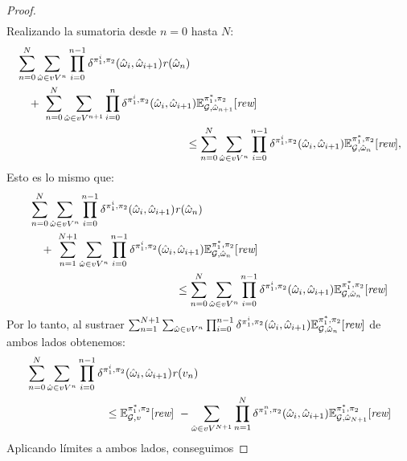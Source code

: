 \begin{proof}
\begin{align*}
  \end{align*}
  Realizando la sumatoria desde $n=0$ hasta $N$:
  \begin{align*}
    & \sum^{N}_{n=0}\sum_{\hat{\omega} \in vV^{n}} \prod^{n-1}_{i=0}\delta^{\strat{1}^i,\strat{2}}(\hat{\omega}_i,\hat{\omega}_{i+1}) \reward(\hat{\omega}_n) \\
    & \quad + \ \sum^{N}_{n=0} \sum_{\hat{\omega} \in vV^{n+1}} \prod^{n}_{i=0}\delta^{\strat{1}^i,\strat{2}}(\hat{\omega}_i,\hat{\omega}_{i+1})  \Expect{\starredstrat{1}}{\strat{2}}_{\StochG,\hat{\omega}_{n+1}}[\Rewards] \\
    & \hspace{15em} \leq 
	\sum^{N}_{n=0}
	\sum_{\hat{\omega} \in vV^{n}} \prod^{n-1}_{i=0}\delta^{\strat{1}^i,\strat{2}}(\hat{\omega}_i, \hat{\omega}_{i+1}) \Expect{\starredstrat{1}}{\strat{2}}_{\StochG,\hat{\omega}_n}[\Rewards],
  \end{align*}
  Esto es lo mismo que:
  \begin{align*}
    & \sum^{N}_{n=0}\sum_{\hat{\omega} \in vV^{n}} \prod^{n-1}_{i=0}\delta^{\strat{1}^i,\strat{2}}(\hat{\omega}_i,\hat{\omega}_{i+1}) \reward(\hat{\omega}_n) \\
    & \quad + \
	\sum^{N+1}_{n=1} \sum_{\hat{\omega} \in vV^{n}} \prod^{n-1}_{i=0}\delta^{\strat{1}^i,\strat{2}}(\hat{\omega}_i,\hat{\omega}_{i+1})  \Expect{\starredstrat{1}}{\strat{2}}_{\StochG,\hat{\omega}_{n}}[\Rewards] \\
    & \hspace{13em} \leq 
	 \sum^{N}_{n=0}
	\sum_{\hat{\omega} \in vV^{n}} \prod^{n-1}_{i=0}\delta^{\strat{1}^i,\strat{2}}(\hat{\omega}_i, \hat{\omega}_{i+1}) \Expect{\starredstrat{1}}{\strat{2}}_{\StochG,\hat{\omega}_n}[\Rewards]
  \end{align*}
  Por lo tanto, al sustraer $\sum^{N+1}_{n=1} \sum_{\hat{\omega} \in vV^{n}} \prod^{n-1}_{i=0}\delta^{\pi_{1}^i,\pi_{2}}(\hat{\omega}_i,\hat{\omega}_{i+1})  \mathbb{E}^{\pi^*_{1}, \pi_{2}}_{\mathcal{G},\hat{\omega}_{n}}[\textit{rew}]$ de ambos lados obtenemos:
  \begin{align*}
    & \sum^{N}_{n=0}\sum_{\hat{\omega} \in vV^{n}} \prod^{n-1}_{i=0}\delta^{\pi_{1}^i,\pi_{2}}(\hat{\omega}_i, \hat{\omega}_{i+1}) \mathit{r}(v_n)\\
    & \hspace{7em} \leq 
      \mathbb{E}^{\pi^*_{1}, \pi_{2}}_{\mathcal{G},v}[\textit{rew}] \ - \sum_{\hat{\omega} \in vV^{N+1}}\prod^{N}_{n=1}\delta^{\pi_{1}^n,\pi_{2}}(\hat{\omega}_i,\hat{\omega}_{i+1}) \mathbb{E}^{\pi^*_{1}, \pi_{2}}_{\mathcal{G}, \hat{\omega}_{N+1}}[\textit{rew}]
  \end{align*}
  Aplicando límites a ambos lados, conseguimos


\end{proof}
